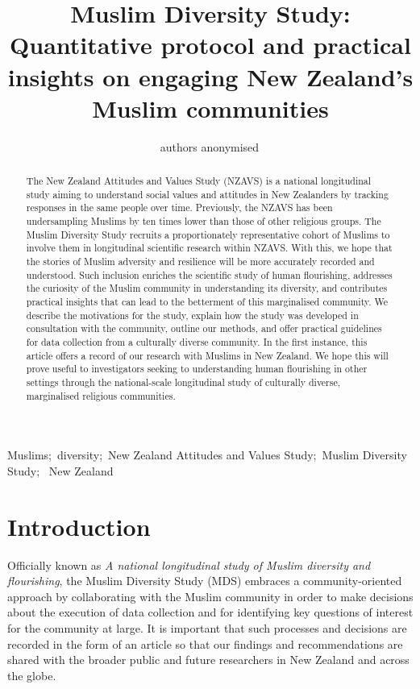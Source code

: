 \documentclass[
]{interact}
\title{Muslim Diversity Study: Quantitative protocol and practical
insights on engaging New Zealand's Muslim communities}
\author{authors anonymised$\textsuperscript{}$}
\begin{document}
\captionsetup{labelsep=space}
\maketitle

\begin{abstract}
The New Zealand Attitudes and Values Study (NZAVS) is a national
longitudinal study aiming to understand social values and attitudes in
New Zealanders by tracking responses in the same people over time.
Previously, the NZAVS has been undersampling Muslims by ten times lower
than those of other religious groups. The Muslim Diversity Study
recruits a proportionately representative cohort of Muslims to involve
them in longitudinal scientific research within NZAVS. With this, we
hope that the stories of Muslim adversity and resilience will be more
accurately recorded and understood. Such inclusion enriches the
scientific study of human flourishing, addresses the curiosity of the
Muslim community in understanding its diversity, and contributes
practical insights that can lead to the betterment of this marginalised
community. We describe the motivations for the study, explain how the
study was developed in consultation with the community, outline our
methods, and offer practical guidelines for data collection from a
culturally diverse community. In the first instance, this article offers
a record of our research with Muslims in New Zealand. We hope this will
prove useful to investigators seeking to understanding human flourishing
in other settings through the national-scale longitudinal study of
culturally diverse, marginalised religious communities.
\end{abstract}
\begin{keywords}
\def\sep{;\ }
Muslims\sep diversity\sep New Zealand Attitudes and Values
Study\sep Muslim Diversity Study\sep 
New Zealand
\end{keywords}


\section{Introduction}\label{sec-intro}

Officially known as \emph{A national longitudinal study of Muslim
diversity and flourishing}, the Muslim Diversity Study (MDS) embraces a
community-oriented approach by collaborating with the Muslim community
in order to make decisions about the execution of data collection and
for identifying key questions of interest for the community at large. It
is important that such processes and decisions are recorded in the form
of an article so that our findings and recommendations are shared with
the broader public and future researchers in New Zealand and across the
globe.
\end{document}
